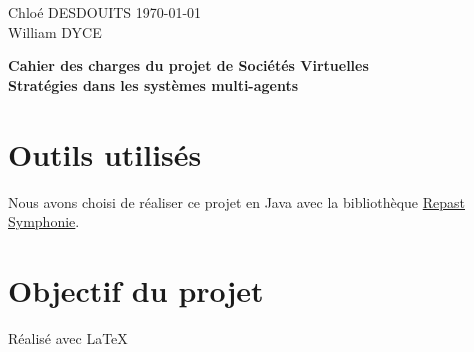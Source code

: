 \documentclass[a4paper]{article}
\begin{document}
\large
\setlength{\parskip}{5mm plus2mm minus2mm}

\begin{titlepage} 
{\setlength{\parindent}{0cm}
Chloé DESDOUITS \hfill \today\\
William DYCE
}
\vfill
{\centering \Large \bfseries Cahier des charges du projet de Sociétés Virtuelles\\Stratégies dans les systèmes multi-agents\par}
\vfill
\tableofcontents
\end{titlepage} 


\section{Outils utilisés}
Nous avons choisi de réaliser ce projet en Java avec la bibliothèque \href{http://repast.sourceforge.net/repast_simphony.html}{Repast Symphonie}.

\section{Objectif du projet}


\vfill
{\raggedleft Réalisé avec \LaTeX{} \par}
\end{document}
